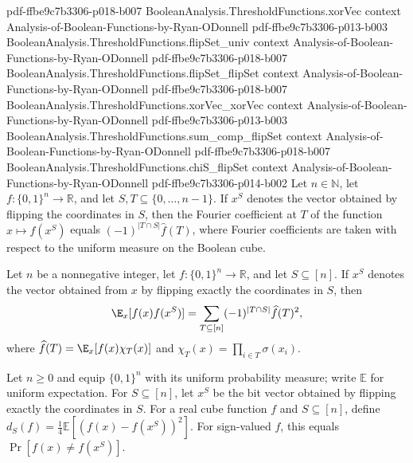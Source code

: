 \begin{lemma}
  {pdf-ffbe9c7b3306-p018-b007}
\proofstep
  {BooleanAnalysis.ThresholdFunctions.xorVec}
  {context}
  {Analysis-of-Boolean-Functions-by-Ryan-ODonnell}
  {pdf-ffbe9c7b3306-p013-b003}
\proofstep
  {BooleanAnalysis.ThresholdFunctions.flipSet_univ}
  {context}
  {Analysis-of-Boolean-Functions-by-Ryan-ODonnell}
  {pdf-ffbe9c7b3306-p018-b007}
\proofstep
  {BooleanAnalysis.ThresholdFunctions.flipSet_flipSet}
  {context}
  {Analysis-of-Boolean-Functions-by-Ryan-ODonnell}
  {pdf-ffbe9c7b3306-p018-b007}
\proofstep
  {BooleanAnalysis.ThresholdFunctions.xorVec_xorVec}
  {context}
  {Analysis-of-Boolean-Functions-by-Ryan-ODonnell}
  {pdf-ffbe9c7b3306-p013-b003}
\proofstep
  {BooleanAnalysis.ThresholdFunctions.sum_comp_flipSet}
  {context}
  {Analysis-of-Boolean-Functions-by-Ryan-ODonnell}
  {pdf-ffbe9c7b3306-p018-b007}
\proofstep
  {BooleanAnalysis.ThresholdFunctions.chiS_flipSet}
  {context}
  {Analysis-of-Boolean-Functions-by-Ryan-ODonnell}
  {pdf-ffbe9c7b3306-p014-b002}
Let $n\in\mathbb N$, let $f:\{0,1\}^n\to\mathbb R$, and let
$S,T\subseteq\{0,\ldots,n-1\}$. If $x^S$ denotes the vector obtained by flipping the
coordinates in $S$, then the Fourier coefficient at $T$ of the function $x\mapsto
f(x^S)$ equals $(-1)^{|T\cap S|}\widehat f(T)$, where Fourier coefficients are taken
with respect to the uniform measure on the Boolean cube.
\end{lemma}

\begin{lemma}
\leanok
{}
Let $n$ be a nonnegative integer, let $f\colon\{0,1\}^n\to\mathbb R$, and let
$S\subseteq[n]$. If $x^S$ denotes the vector obtained from $x$ by flipping exactly the
coordinates in $S$, then
\[
\E_x[f(x)f(x^S)] = \sum_{T\subseteq[n]}(-1)^{|T\cap S|}\widehat f(T)^2,
\]
where $\widehat f(T)=\E_x[f(x)\chi_T(x)]$ and $\chi_T(x)=\prod_{i\in T}\sigma(x_i)$.
\end{lemma}

\begin{definition}
\leanok
{}
Let $n\ge0$ and equip $\{0,1\}^n$ with its uniform probability measure; write $\mathbb E$ for uniform expectation. For $S\subseteq[n]$, let $x^S$ be the bit vector obtained by flipping exactly the coordinates in $S$. For a real cube function $f$ and $S\subseteq[n]$, define $d_S(f)=\tfrac14\mathbb E[(f(x)-f(x^S))^2]$. For sign-valued $f$, this equals $\Pr[f(x)\ne f(x^S)]$.
\end{definition}

